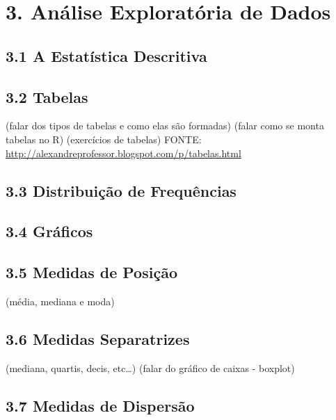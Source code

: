 \documentclass[
]{book}
\theoremstyle{definition}
\theoremstyle{definition}
\theoremstyle{definition}
\theoremstyle{definition}
\theoremstyle{remark}
\begin{document}
\hypertarget{anuxe1lise-exploratuxf3ria-de-dados}{%
\chapter{3. Análise Exploratória de Dados}\label{anuxe1lise-exploratuxf3ria-de-dados}}

\hypertarget{a-estatuxedstica-descritiva}{%
\section{3.1 A Estatística Descritiva}\label{a-estatuxedstica-descritiva}}

\hypertarget{tabelas}{%
\section{3.2 Tabelas}\label{tabelas}}

(falar dos tipos de tabelas e como elas são formadas)
(falar como se monta tabelas no R)
(exercícios de tabelas)
FONTE: \url{http://alexandreprofessor.blogspot.com/p/tabelas.html}

\hypertarget{distribuiuxe7uxe3o-de-frequuxeancias}{%
\section{3.3 Distribuição de Frequências}\label{distribuiuxe7uxe3o-de-frequuxeancias}}

\hypertarget{gruxe1ficos}{%
\section{3.4 Gráficos}\label{gruxe1ficos}}

\hypertarget{medidas-de-posiuxe7uxe3o}{%
\section{3.5 Medidas de Posição}\label{medidas-de-posiuxe7uxe3o}}

(média, mediana e moda)

\hypertarget{medidas-separatrizes}{%
\section{3.6 Medidas Separatrizes}\label{medidas-separatrizes}}

(mediana, quartis, decis, etc\ldots)
(falar do gráfico de caixas - boxplot)

\hypertarget{medidas-de-dispersuxe3o}{%
\section{3.7 Medidas de Dispersão}\label{medidas-de-dispersuxe3o}}
\end{document}
